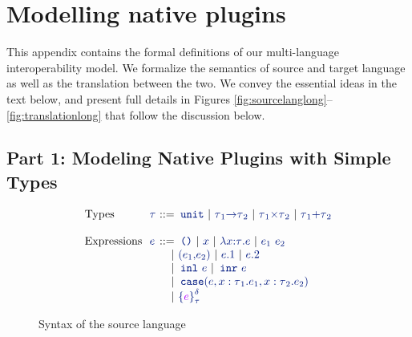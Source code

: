 \newpage

\section{Modelling native plugins}
\label{app:native}

This appendix contains the formal definitions of our multi-language
interoperability model. We formalize the semantics of source and target language
as well as the translation between the two. We convey the essential ideas 
in the text below, and present full details in 
Figures \ref{fig:sourcelanglong}--\ref{fig:translationlong} that follow the discussion below.

\subsection*{Part 1: Modeling Native Plugins with Simple Types}


\iffalse
\begin{figure}[h]
  \centering
\[\begin{array}{@{}l@{~~}l@{~}r@{}l@{}}
\mbox{Types} & \stau & \bnfdef & \stunit%
      \bnfalt \sarrow{\stau_{\source{1}}}{\stau_{\source{2}}}
      \bnfalt \sprod{\stau_{\source{1}}}{\stau_{\source{2}}} \bnfalt \ssum{\stau_{\source{1}}}{\stau_{\source{2}}} \\
& & & \\

\mbox{Expressions} & \sexp & \bnfdef & \sunit \bnfalt \svar{x} \bnfalt \sabs{\svar{x}}{\stau}{\sexp} \bnfalt \sapp{\sexp_{\source{1}}}{\sexp_{\source{2}}} \\
& & \bnfalt & \spair{\sexp_{\source{1}}}{\sexp_{\source{2}}} \bnfalt \sfst{\sexp} \bnfalt \ssnd{\sexp} \\
& & \bnfalt & \sinl{\sexp} \bnfalt \sinr{\sexp} \\
& & \bnfalt & \scasex{\sexp}{\stau_{\source{1}}}{\sexp_{\source{1}}}{\stau_{\source{2}}}{\sexp_{\source{2}}} \\
& & \bnfalt & \salien{\texp}{\stau}{\sdelta} \\
\end{array}\]
  \caption{Syntax of the source language}
  \label{fig:syntax-source}
\end{figure}

